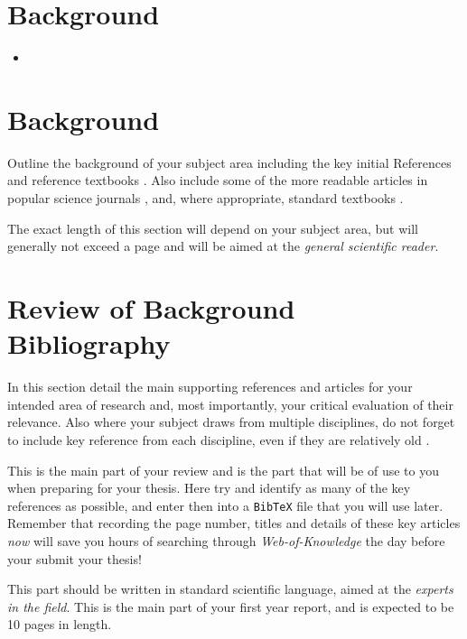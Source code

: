 \documentclass[a4paper,12pt]{article}
\begin{document}
\section{Background}

\begin{itemize}
 \item 
\end{itemize}



\section{Background}

Outline\cite{bioref:KUMAR19989} the background of your subject area including the key initial
References \cite{jr:ashkin} and reference\cite{ob:Costerton1318} textbooks \cite{ob:bornwolf}. 
Also include some of the more
readable articles in popular science journals \cite{jr:dholakia},
and, where appropriate, standard textbooks \cite{ob:hechtoptics}.

The exact length of this section will depend on your subject area,
but will generally not exceed a page and will be aimed at the 
{\it general scientific reader}. 

\section{Review of Background Bibliography}

In this section detail the main supporting references
and articles \cite{jr:block} for your intended area of research
and, most importantly, your critical evaluation of their
relevance.  Also where your subject draws from multiple 
disciplines, do not forget to include key reference from
each discipline, even if they are relatively old \cite{jr:dammann}. 


This is the main part of your review and is the part that
will be of use to you when preparing for your thesis. Here try
and identify as many of the key references as possible, and enter then
into a {\tt BibTeX} file that you will use later. Remember that recording
the page number, titles and details of these 
key articles {\it now} will save you hours of
searching through {\em Web-of-Knowledge} the day before your
submit your thesis!

This part should be written in standard scientific language, 
aimed at the {\em experts in the field}. This is the main part of your first year report, and is 
expected to be 10 pages in length.
\end{document}

